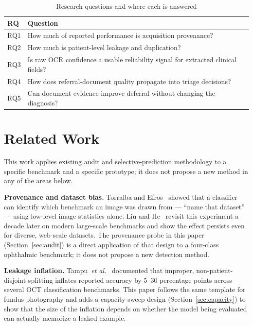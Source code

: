 \documentclass[conference]{IEEEtran}
\begin{document}
\begin{table}[!t]
\caption{Research questions and where each is answered}
\label{tab:rqs}
\centering
\begin{tabular}{@{}p{0.6cm}p{7cm}@{}}
\toprule
RQ & Question \\
\midrule
RQ1 & How much of reported performance is acquisition provenance? \\
RQ2 & How much is patient-level leakage and duplication? \\
RQ3 & Is raw OCR confidence a usable reliability signal for extracted clinical fields? \\
RQ4 & How does referral-document quality propagate into triage decisions? \\
RQ5 & Can document evidence improve deferral without changing the diagnosis? \\
\bottomrule
\end{tabular}
\end{table}

\section{Related Work}

This work applies existing audit and selective-prediction methodology to a
specific benchmark and a specific prototype; it does not propose a new
method in any of the areas below.

\textbf{Provenance and dataset bias.} Torralba and Efros~\cite{torralba2011}
showed that a classifier can identify which benchmark an image was drawn
from --- ``name that dataset'' --- using low-level image statistics alone.
Liu and He~\cite{liu2024decade} revisit this experiment a decade later on
modern large-scale benchmarks and show the effect persists even for
diverse, web-scale datasets. The provenance probe in this paper
(Section~\ref{sec:audit}) is a direct application of that design to a
four-class ophthalmic benchmark; it does not propose a new detection
method.

\textbf{Leakage inflation.} Tampu~\emph{et al.}~\cite{tampu2022} documented
that improper, non-patient-disjoint splitting inflates reported accuracy by
5--30 percentage points across several OCT classification benchmarks. This
paper follows the same template for fundus photography and adds a
capacity-sweep design (Section~\ref{sec:capacity}) to show that the size of
the inflation depends on whether the model being evaluated can actually
memorize a leaked example.
\end{document}
